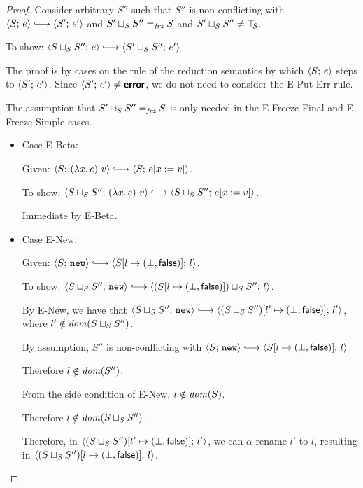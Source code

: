 \begin{proof}
  Consider arbitrary $S''$ such that $S''$ is non-conflicting with
  $\config{S}{e} \parstepsto \config{S'}{e'}$ and $S' \sqcup_{S} S''
  =_{\textit{frz}} S$ and $S' \sqcup_{S} S'' \neq \top\hspace{-0.85mm}_{S}$.

  To show: $\config{\lubstore{S}{S''}}{e} \parstepsto
  \config{\lubstore{S'}{S''}}{e'}$.

  The proof is by cases on the rule of the reduction semantics by
  which $\langle S;\, e \rangle$ steps to $\langle S';\, e' \rangle$.  Since
  $\langle S';\, e' \rangle \neq \textbf{\textsf{error}}$, we do not need to consider the {\sc
    E-Put-Err} rule.

  The assumption that $S' \sqcup_{S} S'' =_{\textit{frz}} S$ is only needed
  in the {\sc E-Freeze-Final} and {\sc E-Freeze-Simple} cases.

  \begin{itemize}

    \item Case {\sc E-Beta}:

      Given: $\config{S}{\app{(\lam{x}{e})}{v}} \parstepsto
      \config{S}{\subst{e}{x}{v}}$.

      To show: $\config{\lubstore{S}{S''}}{\app{(\lam{x}{e})}{v}} \parstepsto
      \config{\lubstore{S}{S''}}{\subst{e}{x}{v}}$.

      Immediate by {\sc E-Beta}.

    \item Case {\sc E-New}:

      Given: $\config{S}{\NEW} \parstepsto
      \config{\extS{S}{l}{\bot}{\frozenfalse}}{l}$.

      To show: $\config{\lubstore{S}{S''}}{\NEW} \parstepsto
      \config{\lubstore{(\extS{S}{l}{\bot}{\frozenfalse})}{S''}}{l}$.

      By {\sc E-New}, we have that $\config{\lubstore{S}{S''}}{\NEW}
      \parstepsto
      \config{\extS{(\lubstore{S}{S''})}{l'}{\bot}{\frozenfalse}}{l'}$,
      where $l' \notin \mathit{dom}(S \sqcup_{S} S'')$.

      By assumption, $S''$ is non-conflicting with $\config{S}{\NEW}
      \parstepsto \config{\extS{S}{l}{\bot}{\frozenfalse}}{l}$.
 
      Therefore $l \notin \mathit{dom}(S'')$.

      From the side condition of {\sc E-New}, $l \notin \mathit{dom}(S)$.

      Therefore $l \notin \mathit{dom}(S \sqcup_{S} S'')$.

      Therefore, in
      $\langle (S \sqcup_{S} S'')[l' \mapsto (\bot, \textsf{false})];\, l' \rangle$,
      we can $\alpha$-rename $l'$ to $l$, resulting in
      $\langle (S \sqcup_{S} S'')[l \mapsto (\bot, \textsf{false})];\, l \rangle$.


\end{itemize}
\end{proof}

